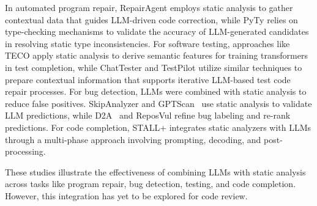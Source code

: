 In automated program repair, RepairAgent \cite{bouzenia2024repairagent} employs static analysis to gather contextual data that guides LLM-driven code correction, while PyTy \cite{chow2024pyty} relies on type-checking mechanisms to validate the accuracy of LLM-generated candidates in resolving static type inconsistencies. For software testing, approaches like TECO \cite{nie2023learning} apply static analysis to derive semantic features for training transformers in test completion, while ChatTester \cite{yuan2023no} and TestPilot \cite{schafer2023adaptive} utilize similar techniques to prepare contextual information that supports iterative LLM-based test code repair processes. For bug detection, LLMs were combined with static analysis to reduce false positives. SkipAnalyzer \cite{mohajer2023skipanalyzer} and GPTScan~\cite{sun2024gptscan} use static analysis to validate LLM predictions, while D2A~\cite{zheng2021d2a} and ReposVul \cite{wang2024reposvul} refine bug labeling and re-rank predictions.
For code completion, STALL+ \cite{liu2024stall+} integrates static analyzers with LLMs through a multi-phase approach involving prompting, decoding, and post-processing.

These studies illustrate the effectiveness of combining LLMs with static analysis across tasks like program repair, bug detection, testing, and code completion. However, this integration has yet to be explored for code review.





